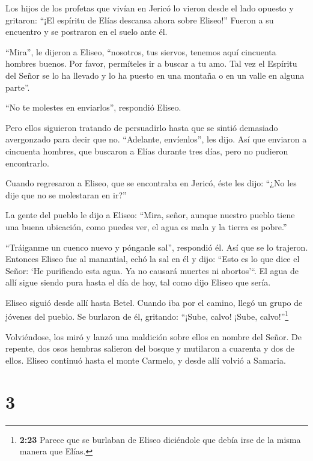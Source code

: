  Los hijos de los profetas que vivían en Jericó lo vieron
desde el lado opuesto y gritaron: ``¡El espíritu de Elías descansa ahora
sobre Eliseo!'' Fueron a su encuentro y se postraron en el suelo ante
él.

 ``Mira'', le dijeron a Eliseo, ``nosotros, tus siervos,
tenemos aquí cincuenta hombres buenos. Por favor, permíteles ir a buscar
a tu amo. Tal vez el Espíritu del Señor se lo ha llevado y lo ha puesto
en una montaña o en un valle en alguna parte''.

``No te molestes en enviarlos'', respondió Eliseo.

 Pero ellos siguieron tratando de persuadirlo hasta que se
sintió demasiado avergonzado para decir que no. ``Adelante, envíenlos'',
les dijo. Así que enviaron a cincuenta hombres, que buscaron a Elías
durante tres días, pero no pudieron encontrarlo.

 Cuando regresaron a Eliseo, que se encontraba en Jericó,
éste les dijo: ``¿No les dije que no se molestaran en ir?''

 La gente del pueblo le dijo a Eliseo: ``Mira, señor,
aunque nuestro pueblo tiene una buena ubicación, como puedes ver, el
agua es mala y la tierra es pobre.''

 ``Tráiganme un cuenco nuevo y pónganle sal'', respondió
él. Así que se lo trajeron.  Entonces Eliseo fue al
manantial, echó la sal en él y dijo: ``Esto es lo que dice el Señor: `He
purificado esta agua. Ya no causará muertes ni abortos'``. 
El agua de allí sigue siendo pura hasta el día de hoy, tal como dijo
Eliseo que sería.

 Eliseo siguió desde allí hasta Betel. Cuando iba por el
camino, llegó un grupo de jóvenes del pueblo. Se burlaron de él,
gritando: ``¡Sube, calvo! ¡Sube, calvo!''\footnote{\textbf{2:23} Parece
  que se burlaban de Eliseo diciéndole que debía irse de la misma manera
  que Elías.}

 Volviéndose, los miró y lanzó una maldición sobre ellos en
nombre del Señor. De repente, dos osos hembras salieron del bosque y
mutilaron a cuarenta y dos de ellos.  Eliseo continuó hasta
el monte Carmelo, y desde allí volvió a Samaria.

\hypertarget{section-2}{%
\section{3}\label{section-2}}

